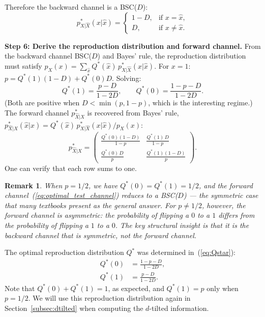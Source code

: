 \documentclass[11pt]{article}
\newtheorem{remark}{Remark}[section]
\begin{document}
Therefore the backward channel is a BSC($D$):
\begin{equation}
\label{eq:backward_channel}
p^*_{X|\hat{X}}(x|\hat{x}) =
\begin{cases}
1-D, & \text{if } x = \hat{x},\\
D, & \text{if } x \neq \hat{x}.
\end{cases}
\end{equation}

\smallskip
\noindent\textbf{Step 6: Derive the reproduction distribution and forward channel.}
From the backward channel BSC($D$) and Bayes' rule, the reproduction
distribution must satisfy
$p_X(x) = \sum_{\hat{x}} Q^*(\hat{x})\,p^*_{X|\hat{X}}(x|\hat{x})$.
For $x = 1$: $p = Q^*(1)(1-D) + Q^*(0)D$.
Solving:
\begin{equation}
\label{eq:Qstar}
Q^*(1) = \frac{p - D}{1 - 2D}, \qquad
Q^*(0) = \frac{1 - p - D}{1 - 2D}.
\end{equation}
(Both are positive when $D < \min(p, 1-p)$, which is the interesting regime.)
The forward channel $p^*_{\hat{X}|X}$ is recovered from Bayes' rule,
$p^*_{\hat{X}|X}(\hat{x}|x) = Q^*(\hat{x})\,p^*_{X|\hat{X}}(x|\hat{x})
/p_X(x)$:
\begin{equation}
\label{eq:optimal_test_channel}
p^*_{\hat{X}|X} =
\begin{pmatrix}
\frac{Q^*(0)(1-D)}{1-p} & \frac{Q^*(1)\,D}{1-p} \\[6pt]
\frac{Q^*(0)\,D}{p} & \frac{Q^*(1)(1-D)}{p}
\end{pmatrix}.
\end{equation}
One can verify that each row sums to one.

\begin{remark}
When $p = 1/2$, we have $Q^*(0) = Q^*(1) = 1/2$, and the forward
channel~(\ref{eq:optimal_test_channel}) reduces to a BSC($D$) ---
the symmetric case that many textbooks present as the general answer.
For $p \neq 1/2$, however, the forward channel is \emph{asymmetric}:
the probability of flipping a $0$ to a $1$ differs from the probability of
flipping a $1$ to a $0$.
The key structural insight is that it is the \emph{backward} channel that is
symmetric, not the forward channel.
\end{remark}

The optimal reproduction distribution $Q^*$ was determined
in~(\ref{eq:Qstar}):
\begin{align}
Q^*(0) &= \frac{1 - p - D}{1 - 2D}, \label{eq:repro_dist_0}\\
Q^*(1) &= \frac{p - D}{1 - 2D}. \label{eq:repro_dist_1}
\end{align}
Note that $Q^*(0) + Q^*(1) = 1$, as expected, and $Q^*(1) = p$ only when
$p = 1/2$.
We will use this reproduction distribution again in
Section~\ref{subsec:dtilted} when computing the $d$-tilted information.
\end{document}
